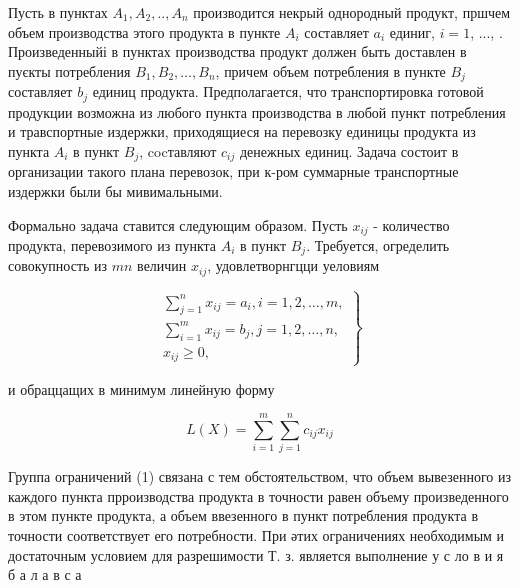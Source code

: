 \documentclass[10pt]{article}
\begin{document}
Пусть в пунктах $A_{1}, A_{2}, . ., A_{n}$ производится некрый однородный продукт, пршчем объем производства этого продукта в пункте $A_{i}$ составляет $a_{i}$ единиг, $i=1$, ..., . Произведенныйі в пунктах производства продукт должен быть доставлен в пуєкты потребления $B_{1}, B_{2}, \ldots, B_{n}$, причем объем потребления в пункте $B_{j}$ составляет $b_{j}$ единиц продукта. Предполагается, что транспортировка готовой продукции возможна из любого пункта производства в любой пункт потребления и травспортные издержки, приходящиеся на перевозку единицы продукта из пункта $A_{i}$ в пункт $B_{j}$, cocтавляют $c_{i j}$ денежных единиц. Задача состоит в организации такого плана перевозок, при к-ром суммарные транспортные издержки были бы мивимальными.



Формально задача ставится следующим образом. Пусть $x_{i j}$ - количество продукта, перевозимого из пункта $A_{i}$ в пункт $B_{j}$. Требуется, огределить совокупность из $m n$ величин $x_{i j}$, удовлетворнгцци уеловиям



\[

\left.\begin{array}{c}

\sum_{j=1}^{n} x_{i j}=a_{i}, i=1,2, \ldots, m, \\

\sum_{i=1}^{m} x_{i j}=b_{j}, j=1,2, \ldots, n, \\

x_{i j} \geqslant 0,

\end{array}\right\}

\]



и обраццащих в минимум линейную форму



\[

L(X)=\sum_{i=1}^{m} \sum_{j=1}^{n} c_{i j} x_{i j}

\]



Группа ограничений (1) связана с тем обстоятельством, что объем вывезенного из каждого пункта прроизводства продукта в точности равен объему произведенного в этом пункте продукта, а объем ввезенного в пункт потребления продукта в точности соответствует его потребности. При әтих ограничениях необходимым и достаточным условием для разрешимости Т. з. является выполнение у с ло в и я б а л а в с а
\end{document}
